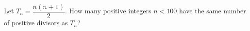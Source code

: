 Let $T_n=\dfrac{n(n+1)}{2}$. How many positive integers $n<100$ have the same number of positive divisors as $T_n$?

